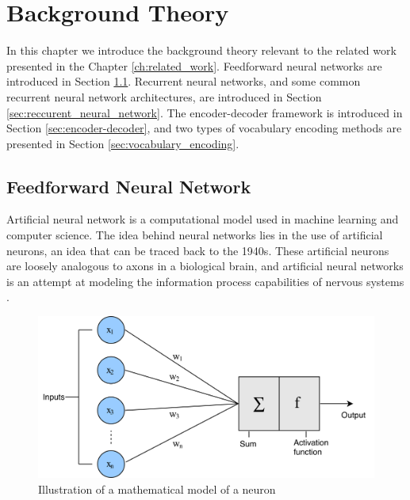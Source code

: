 
\chapter{Background Theory}
\label{ch:background}
In this chapter we introduce the background theory relevant to the related work presented in the Chapter \ref{ch:related_work}. Feedforward neural networks are introduced in Section \ref{sec:feedforward_neural_network}. Recurrent neural networks, and some common recurrent neural network architectures, are introduced in Section \ref{sec:reccurent_neural_network}. The encoder-decoder framework is introduced in Section \ref{sec:encoder-decoder}, and two types of vocabulary encoding methods are presented in Section \ref{sec:vocabulary_encoding}.


\section{Feedforward Neural Network}
\label{sec:feedforward_neural_network}
Artificial neural network is a computational model used in machine learning and computer science. The idea behind neural networks lies in the use of artificial neurons, an idea that can be traced back to the 1940s. These artificial neurons are loosely analogous to axons in a biological brain, and artificial neural networks is an attempt at modeling the information process capabilities of nervous systems \citep{russell2010aimodernapproach}.

\begin{figure}[ht]
    \centering
    \includegraphics[width=1\textwidth]{fig/related_work/perceptron.png}
    \caption{Illustration of a mathematical model of a neuron}
    \label{fig:nn-perceptron}
\end{figure}


